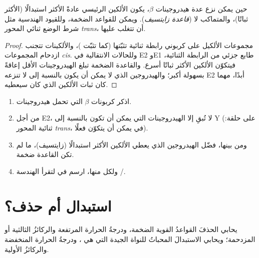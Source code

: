 \begin{proposition}\label{prop:b1:elimination:zaitsev}
حين يمكن نزع عدة هيدروجينات $\beta$، يكون الألكين الرئيسي
عادةً الأكثر استبدالًا (الأكثر ثباتًا)، والمتماكب 
لا  (\emph{قاعدة زايتسيف}).
ويمكن للقواعد الضخمة، وللقيود الهندسية مثل شرط الوضع ثنائي المحور
\textit{trans}، أن تتغلب عليها.
\end{proposition}

\begin{proof}
مجموعات الألكيل على كربوني رابطة ثنائية تثبّتها (كما
تثبّت )، والألكينات  تتجنب ازدحام
المجموعات \textit{cis}. وللحالات الانتقالية في E2 وE1 طابع جزئي من
الرابطة الثنائية، فيتكوّن الألكين الأكثر ثباتًا أسرع.
والقاعدة الضخمة تبلغ الهيدروجينات الأقل إعاقةً بسهولة أكبر؛
والهيدروجين الذي لا يمكن أن يكون  بالنسبة إلى  لا
تنزعه E2 أبدًا، مهما كان ثبات الألكين الذي كان سيعطيه.
\end{proof}

\begin{method}\label{met:b1:elimination:predict-alkene}
\begin{enumerate}
  \item اذكر كربونات $\beta$ التي تحمل هيدروجينات.
  \item من أجل E2، لا تُبقِ إلا الهيدروجينات التي يمكن أن تكون  بالنسبة إلى Y (على
        حلقة: ثنائية المحور \textit{trans}، في  يمكن أن يتكوّن فعلًا).
  \item ومن بينها، فضّل الهيدروجين الذي يعطي الألكين الأكثر استبدالًا
        (زايتسيف)، ما لم تكن القاعدة ضخمة.
  \item ولكل منها، ارسم  في  لتقرأ
        الهندسة /.
\end{enumerate}
\end{method}

\section{استبدال أم حذف؟}

\begin{proposition}\label{prop:b1:elimination:sn-vs-e}
يحابي الحذفَ القواعدُ القوية الضخمة، ودرجةُ الحرارة المرتفعة
والركائزُ الثالثية أو المزدحمة؛ ويحابي الاستبدالَ المحباتُ للنواة الجيدة التي هي
، ودرجةُ الحرارة المنخفضة والركائزُ الأولية.
\end{proposition}

